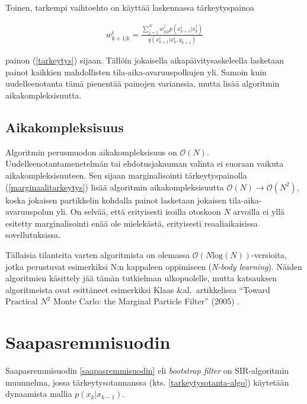 \documentclass[
  12pt,
  a4paper, twoside]{book}
\begin{document}
Toinen, tarkempi vaihtoehto on käyttää laskennassa tärkeytyspainoa

\begin{align}\label{marginaalitarkeytys}
w_{k+1|k}^i=\frac{\sum_{j=1}^{N}w_{k|k}^jp(x_{k+1}^i|x_k^j)}{q(x_{k+1}^i|x_k^i,y_{k+1})}
\end{align}

\noindent painon (\ref{tarkeytys}) sijaan. Tällöin jokaisella aikapäivitysaskeleella lasketaan painot kaikkien mahdollisten tila-aika-avaruuspolkujen yli. Samoin kuin uudelleenotanta tämä pienentää painojen varianssia, mutta lisää algoritmin aikakompleksisuutta.

\subsection{Aikakompleksisuus}

Algoritmin perusmuodon aikakompleksisuus on \(\mathcal{O}(N)\). Uudelleenotantamenetelmän tai ehdotusjakauman valinta ei suoraan vaikuta aikakompleksisuuteen. Sen sijaan marginalisointi tärkeytyspainolla (\ref{marginaalitarkeytys}) lisää algoritmin aikakompleksisuutta \(\mathcal{O}(N)\rightarrow\mathcal{O}(N^2)\), koska jokaisen partikkelin kohdalla painot lasketaan jokaisen tila-aika-avaruuspolun yli. On selvää, että erityisesti isoilla otoskoon \(N\) arvoilla ei yllä esitetty marginalisointi enää ole mielekästä, erityisesti reaaliaikaisissa sovellutuksissa.

Tällaisia tilanteita varten algoritmista on olemassa \(\mathcal{O}(N\text{log}(N))\)-versioita, jotka perustuvat esimerkiksi N:n kappaleen oppimiseen (\emph{N-body learning}). Näiden algoritmien käsittely jää tämän tutkielman ulkopuolelle, mutta katsauksen algoritmeista ovat esittäneet esimerkiksi Klaas \&al.~artikkelissa ``Toward Practical \(N^2\) Monte Carlo: the Marginal Particle Filter'' (2005) \citep{klaas-2005}.

\section{Saapasremmisuodin}

Saapasremmisuodin \ref{saapasremmisuodin} eli \emph{bootstrap filter} on SIR-algoritmin muunnelma, jossa tärkeytysotannanssa (kts. \ref{tarkeytysotanta-algo}) käytetään dynaamista mallia \(p(x_k|x_{k-1})\).
\end{document}
